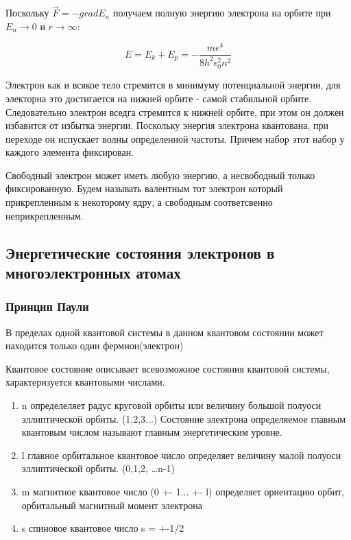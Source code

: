\documentclass[../main.tex]{subfiles}
\begin{document}
Поскольку $\vec F = - grad E_n$ получаем полную энергию электрона на орбите при $E_n \to 0$ и $r \to \infty$:

\[E = E_k + E_p = - \frac{me^4}{8 h^2 \epsilon_0 ^2 n^2}\]

Электрон как и всякое тело стремится в минимуму потенциальной энергии, для электорна это достигается на нижней орбите - самой стабильной орбите. 
Следовательно электрон вседга стремится к нижней орбите, при этом он должен избавится от избытка энергии. 
Поскольку энергия электрона квантована, при переходе он испускает волны определенной частоты.
Причем набор этот набор у каждого элемента фиксирован. 

Свободный электрон может иметь любую энергию, а несвободный только фиксированную.
Будем называть валентным тот электрон который прикрепленным к некоторому ядру, а свободным соответсвенно неприкрепленным.

\subsection{Энергетические состояния электронов в многоэлектронных атомах}

\subsubsection{Принцип Паули}
\begin{center}
    В пределах одной квантовой системы в данном квантовом состоянии может находится только один фермион(электрон)
\end{center}
Квантовое состояние описывает всевозможное состояния квантовой системы, характеризуется квантовыми числами.
\begin {enumerate}
    \item n определеляет радус круговой орбиты или величину большой полуоси эллиптической орбиты. (1,2,3...)
Состояние электрона определяемое главным квантовым числом называют главным энергетическим уровне.

    \item l главное орбитальное квантовое число определяет величину малой полуоси эллиптической орбиты. (0,1,2, \ldots n-1) 

    \item m магнитное квантовое число (0 +- 1... +- l) определяет ориентацию орбит, орбитальный магнитный момент электрона

    \item s спиновое квантовое число s = +-1/2
\end{enumerate}
\end{document}
